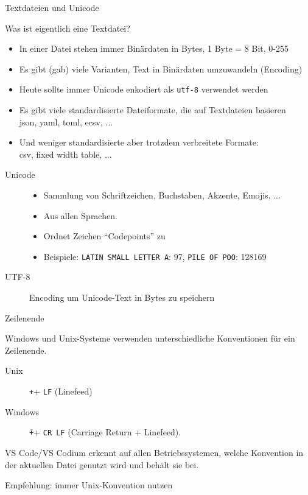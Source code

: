 \begin{frame}[c]{Textdateien und Unicode}

  Was ist eigentlich eine Textdatei?

  \begin{itemize}
    \item In einer Datei stehen immer Binärdaten in Bytes, 1 Byte = 8 Bit, 0-255
    \item Es gibt (gab) viele Varianten, Text in Binärdaten umzuwandeln (Encoding)
    \item Heute sollte immer Unicode enkodiert als \texttt{utf-8} verwendet werden
    \item Es gibt viele standardisierte Dateiformate, die auf Textdateien basieren\\
      json, yaml, toml, ecsv, ...
    \item Und weniger standardisierte aber trotzdem verbreitete Formate: \\
      csv, fixed width table, ...
  \end{itemize}

  \begin{description}
    \item[Unicode]
      \begin{itemize}
        \item Sammlung von Schriftzeichen, Buchstaben, Akzente, Emojis, ...
        \item Aus allen Sprachen.
        \item Ordnet Zeichen \enquote{Codepoints} zu
        \item Beispiele: \texttt{LATIN SMALL LETTER A}: 97, \texttt{PILE OF POO}: 128169
      \end{itemize}
    \item[UTF-8] Encoding um Unicode-Text in Bytes zu speichern
  \end{description}
\end{frame}

\begin{frame}[c]{Zeilenende}

  Windows und Unix-Systeme verwenden unterschiedliche Konventionen für ein Zeilenende.

  \begin{description}
    \item[Unix] \texttt+\n+ \hspace{3.15em} \texttt{LF} (Linefeed)
    \item[Windows] \texttt+\r\n+ \hspace{2em} \texttt{CR LF} (Carriage Return + Linefeed).
  \end{description}

  VS Code/VS Codium erkennt auf allen Betriebssystemen, welche Konvention in der aktuellen Datei
  genutzt wird und behält sie bei.

  Empfehlung: immer Unix-Konvention nutzen

\end{frame}

